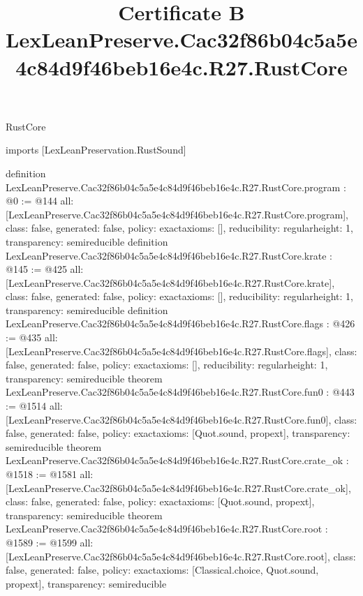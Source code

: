 \begin{lexlean}{RustCore}
\title{Certificate B LexLeanPreserve.Cac32f86b04c5a5e4c84d9f46beb16e4c.R27.RustCore}
\begin{coremodule}
imports [LexLeanPreservation.RustSound]

definition LexLeanPreserve.Cac32f86b04c5a5e4c84d9f46beb16e4c.R27.RustCore.program : @0 := @144 {
  all: [LexLeanPreserve.Cac32f86b04c5a5e4c84d9f46beb16e4c.R27.RustCore.program],
  class: false,
  generated: false,
  policy: exact{axioms: []},
  reducibility: regular{height: 1},
  transparency: semireducible
}
definition LexLeanPreserve.Cac32f86b04c5a5e4c84d9f46beb16e4c.R27.RustCore.krate : @145 := @425 {
  all: [LexLeanPreserve.Cac32f86b04c5a5e4c84d9f46beb16e4c.R27.RustCore.krate],
  class: false,
  generated: false,
  policy: exact{axioms: []},
  reducibility: regular{height: 1},
  transparency: semireducible
}
definition LexLeanPreserve.Cac32f86b04c5a5e4c84d9f46beb16e4c.R27.RustCore.flags : @426 := @435 {
  all: [LexLeanPreserve.Cac32f86b04c5a5e4c84d9f46beb16e4c.R27.RustCore.flags],
  class: false,
  generated: false,
  policy: exact{axioms: []},
  reducibility: regular{height: 1},
  transparency: semireducible
}
theorem LexLeanPreserve.Cac32f86b04c5a5e4c84d9f46beb16e4c.R27.RustCore.fun0 : @443 := @1514 {
  all: [LexLeanPreserve.Cac32f86b04c5a5e4c84d9f46beb16e4c.R27.RustCore.fun0],
  class: false,
  generated: false,
  policy: exact{axioms: [Quot.sound, propext]},
  transparency: semireducible
}
theorem LexLeanPreserve.Cac32f86b04c5a5e4c84d9f46beb16e4c.R27.RustCore.crate_ok : @1518 := @1581 {
  all: [LexLeanPreserve.Cac32f86b04c5a5e4c84d9f46beb16e4c.R27.RustCore.crate_ok],
  class: false,
  generated: false,
  policy: exact{axioms: [Quot.sound, propext]},
  transparency: semireducible
}
theorem LexLeanPreserve.Cac32f86b04c5a5e4c84d9f46beb16e4c.R27.RustCore.root : @1589 := @1599 {
  all: [LexLeanPreserve.Cac32f86b04c5a5e4c84d9f46beb16e4c.R27.RustCore.root],
  class: false,
  generated: false,
  policy: exact{axioms: [Classical.choice, Quot.sound, propext]},
  transparency: semireducible
}


\end{coremodule}
\end{lexlean}

